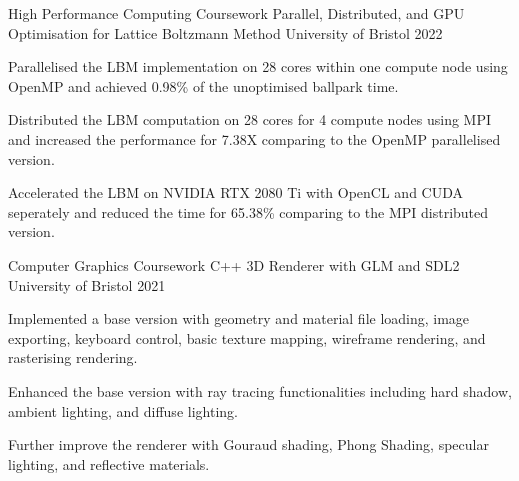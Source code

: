 

\begin{cventries}

  \cventry
    {High Performance Computing Coursework} %
    {Parallel, Distributed, and GPU Optimisation for Lattice Boltzmann Method} %
    {University of Bristol} %
    {2022} %
    {
      \begin{cvitems} %
        \item {Parallelised the LBM implementation on 28 cores within one compute node using OpenMP and achieved 0.98\% of the unoptimised ballpark time.}
        \item {Distributed the LBM computation on 28 cores for 4 compute nodes using MPI and increased the performance for 7.38X comparing to the OpenMP parallelised version.}
        \item {Accelerated the LBM on NVIDIA RTX 2080 Ti with OpenCL and CUDA seperately and reduced the time for 65.38\% comparing to the MPI distributed version.}
      \end{cvitems}
    }

  \cventry
    {Computer Graphics Coursework} %
    {C++ 3D Renderer with GLM and SDL2} %
    {University of Bristol} %
    {2021} %
    {
      \begin{cvitems} %
        \item {Implemented a base version with geometry and material file loading, image exporting, keyboard control, basic texture mapping, wireframe rendering, and rasterising rendering.}
        \item {Enhanced the base version with ray tracing functionalities including hard shadow, ambient lighting, and diffuse lighting.}
        \item {Further improve the renderer with Gouraud shading, Phong Shading, specular lighting, and reflective materials.}
      \end{cvitems}
    }


\end{cventries}
